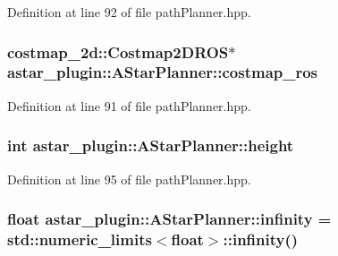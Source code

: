 Definition at line 92 of file path\+Planner.\+hpp.

\subsubsection[{\texorpdfstring{costmap\+\_\+ros}{costmap_ros}}]{\setlength{\rightskip}{0pt plus 5cm}costmap\+\_\+2d\+::\+Costmap2\+D\+R\+OS$\ast$ astar\+\_\+plugin\+::\+A\+Star\+Planner\+::costmap\+\_\+ros}\hypertarget{classastar__plugin_1_1_a_star_planner_a1be22c40d97241edb0a60b7bd3c332f3}{}\label{classastar__plugin_1_1_a_star_planner_a1be22c40d97241edb0a60b7bd3c332f3}


Definition at line 91 of file path\+Planner.\+hpp.

\subsubsection[{\texorpdfstring{height}{height}}]{\setlength{\rightskip}{0pt plus 5cm}int astar\+\_\+plugin\+::\+A\+Star\+Planner\+::height}\hypertarget{classastar__plugin_1_1_a_star_planner_ad3806c8e75f4008de6b4ba1a1cbd2c42}{}\label{classastar__plugin_1_1_a_star_planner_ad3806c8e75f4008de6b4ba1a1cbd2c42}


Definition at line 95 of file path\+Planner.\+hpp.

\subsubsection[{\texorpdfstring{infinity}{infinity}}]{\setlength{\rightskip}{0pt plus 5cm}float astar\+\_\+plugin\+::\+A\+Star\+Planner\+::infinity = std\+::numeric\+\_\+limits$<$float$>$\+::infinity()}\hypertarget{classastar__plugin_1_1_a_star_planner_a0d9b3ad5c3a83a96192609939af84c3d}{}\label{classastar__plugin_1_1_a_star_planner_a0d9b3ad5c3a83a96192609939af84c3d}


